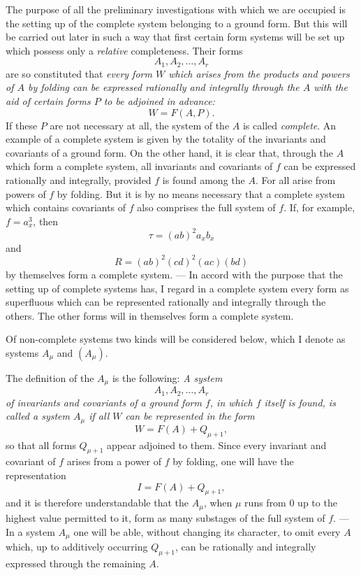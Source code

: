 \documentclass[10pt]{article}
\begin{document}
The purpose of all the preliminary investigations with which we are occupied is the setting up of the complete system belonging to a ground form. But this will be carried out later in such a way that first certain form systems will be set up which possess only a \emph{relative} completeness. Their forms
\[
A_1,A_2,\ldots,A_r
\]
are so constituted that \emph{every form $W$ which arises from the products and powers of $A$ by folding can be expressed rationally and integrally through the $A$ with the aid of certain forms $P$ to be adjoined in advance:}
\[
W=F(A,P).
\]
If these $P$ are not necessary at all, the system of the $A$ is called \emph{complete}. An example of a complete system is given by the totality of the invariants and covariants of a ground form. On the other hand, it is clear that, through the $A$ which form a complete system, all invariants and covariants of $f$ can be expressed rationally and integrally, provided $f$ is found among the $A$. For all arise from powers of $f$ by folding. But it is by no means necessary that a complete system which contains covariants of $f$ also comprises the full system of $f$. If, for example, $f=a_x^3$, then
\[
\tau=(ab)^2a_xb_x
\]
and
\[
R=(ab)^2(cd)^2(ac)(bd)
\]
by themselves form a complete system. --- In accord with the purpose that the setting up of complete systems has, I regard in a complete system every form as superfluous which can be represented rationally and integrally through the others. The other forms will in themselves form a complete system.

Of non-complete systems two kinds will be considered below, which I denote as systems $A_\mu$ and $(A_\mu)$.

The definition of the $A_\mu$ is the following: \emph{A system}
\[
A_1,A_2,\ldots,A_r
\]
\emph{of invariants and covariants of a ground form $f$, in which $f$ itself is found, is called a system $A_\mu$ if all $W$ can be represented in the form}
\[
W=F(A)+Q_{\mu+1},
\]
so that all forms $Q_{\mu+1}$ appear adjoined to them. Since every invariant and covariant of $f$ arises from a power of $f$ by folding, one will have the representation
\[
I=F(A)+Q_{\mu+1},
\]
and it is therefore understandable that the $A_\mu$, when $\mu$ runs from 0 up to the highest value permitted to it, form as many substages of the full system of $f$. --- In a system $A_\mu$ one will be able, without changing its character, to omit every $A$ which, up to additively occurring $Q_{\mu+1}$, can be rationally and integrally expressed through the remaining $A$.
\end{document}
